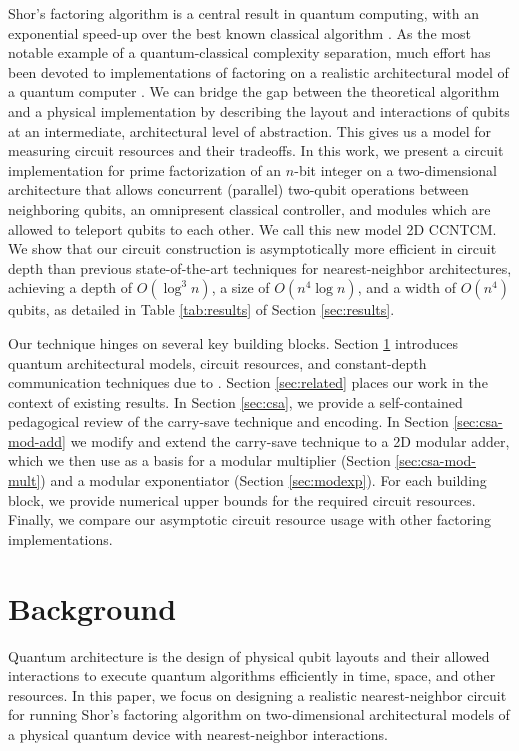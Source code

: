 \documentclass[twoside]{article}
\begin{document}
Shor's factoring algorithm is a central result in quantum computing, with an
exponential speed-up over the best known classical algorithm \cite{Shor1994}.
As the most notable example of a quantum-classical complexity separation, much
effort has been devoted to implementations of factoring on a
realistic architectural model of a quantum computer
\cite{Beauregard2002,Kutin2006,VanMeter2006,VanMeter2005,VanMeterIL2005}.
We can bridge the gap between
the theoretical algorithm and a physical implementation by describing
the layout and interactions of qubits at an intermediate,
architectural level of abstraction.
This gives us a model for measuring circuit resources and their tradeoffs.
In this work, we present a circuit implementation for prime
factorization of an $n$-bit integer
on a two-dimensional architecture that allows concurrent (parallel) two-qubit operations
between neighboring qubits, an omnipresent classical controller, and
modules which are allowed to teleport qubits to each other. We call this new
model \textsc{2D CCNTCM}.
We show that our circuit construction is asymptotically more efficient in circuit depth than previous state-of-the-art techniques for nearest-neighbor
architectures, achieving a depth of $O(\log^3 n)$, a size of
$O(n^4\log n)$, and a width of $O(n^4)$ qubits, as detailed in Table
\ref{tab:results} of Section \ref{sec:results}.

Our technique hinges on several key building blocks.
Section \ref{sec:bg} introduces quantum architectural models, circuit
resources, and constant-depth communication techniques due to
\cite{Harrow2012,Rosenbaum2012}.
Section \ref{sec:related} places our work in the context of existing
results.
In Section \ref{sec:csa}, we provide a self-contained pedagogical review
of the carry-save technique and encoding.
In Section \ref{sec:csa-mod-add} we modify and extend the carry-save technique to a 2D
modular adder,
which we then use as a basis for a modular multiplier
(Section \ref{sec:csa-mod-mult}) and a modular exponentiator
(Section \ref{sec:modexp}).
For each building block, we provide numerical upper bounds for the
required circuit resources.
Finally, we compare our asymptotic circuit resource usage
with other factoring implementations.

%
\section{Background}
\label{sec:bg}

Quantum architecture is the design of physical qubit layouts
and their allowed interactions to execute
quantum algorithms efficiently in time, space, and other
resources.
In this paper, we focus on designing a realistic nearest-neighbor circuit for running
Shor's factoring algorithm on two-dimensional
architectural models of a physical quantum device with nearest-neighbor
interactions.
\end{document}
